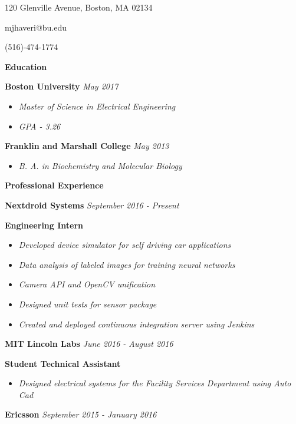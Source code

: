 \documentclass[8pt]{extarticle}
\begin{document}
\begin{center} 

120 Glenville Avenue, Boston, MA 02134

mjhaveri@bu.edu 

(516)-474-1774 
\end{center} 
\begin{changemargin}{-0.8cm}{0.0cm}
\textbf{Education}
\end{changemargin}
\vspace*{-0.4cm}
\makebox[\linewidth]{\rule{17cm}{0.4pt}}
\textbf{Boston University} \textit{May 2017}
\begin{itemize}
\item \textit{Master of Science in Electrical Engineering}
\item \textit{GPA - 3.26}
\end{itemize}
\textbf{Franklin and Marshall College} \textit{May 2013}
\begin{itemize}
\item \textit{B. A. in Biochemistry and Molecular Biology }

\end{itemize}

\begin{changemargin}{-0.8cm}{0.0cm}
\textbf{Professional Experience}
\end{changemargin}
\vspace*{-0.4cm}
\makebox[\linewidth]{\rule{17cm}{0.4pt}}
\textbf{Nextdroid Systems} \textit{September 2016 - Present}

\textbf{Engineering Intern} 
\begin{itemize}
\item \textit{Developed device simulator for self driving car applications}
\item \textit{Data analysis of labeled images for training neural networks}
\item \textit{Camera API and OpenCV unification}
\item \textit{Designed unit tests for sensor package}
\item \textit{Created and deployed continuous integration server using Jenkins}
\end{itemize}
\textbf{MIT Lincoln Labs} \textit{June  2016 - August 2016}

\textbf{Student Technical Assistant } 
\begin{itemize}
\item \textit{Designed electrical systems for the Facility Services Department using Auto Cad}
\end{itemize}
\textbf{Ericsson} \textit{September  2015 - January 2016}
\end{document}
